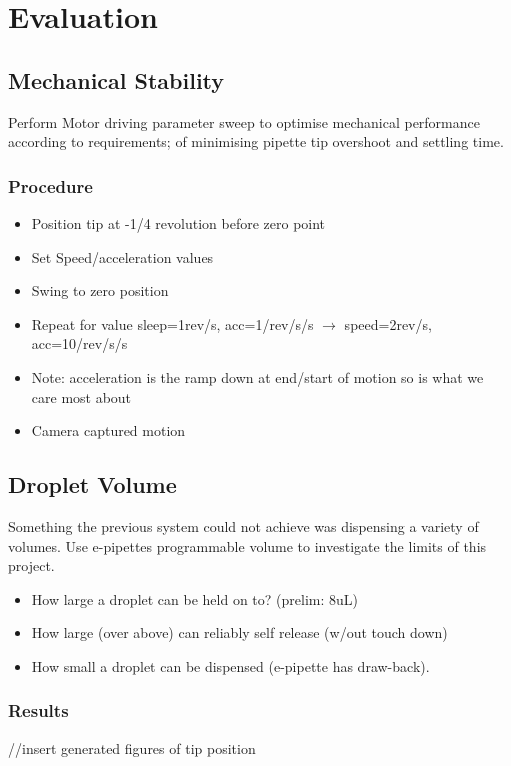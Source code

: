 \chapter{Evaluation}\label{C:eval}

\section{Mechanical Stability}
Perform Motor driving parameter sweep to optimise mechanical performance according to requirements; 
of minimising pipette tip overshoot and settling time.
\subsection{Procedure}
\begin{itemize}
    \item Position tip at -1/4 revolution before zero point
    \item Set Speed/acceleration values
    \item Swing to zero position
    \item Repeat for value sleep=1rev/s, acc=1/rev/s/s $\rightarrow$  speed=2rev/s, acc=10/rev/s/s
    \item Note: acceleration is the ramp down at end/start of motion so is what we care most about
    \item Camera captured motion 
\end{itemize}

\section{Droplet Volume}
Something the previous system could not achieve was dispensing a variety of volumes.
Use e-pipettes programmable volume to investigate the limits of this project.
\begin{itemize}
    \item How large a droplet can be held on to? (prelim: 8uL)
    \item How large (over above) can reliably self release (w/out touch down)
    \item How small a droplet can be dispensed (e-pipette has draw-back).
\end{itemize}    

\subsection{Results}

//insert generated figures of tip position

